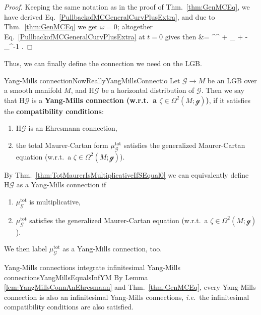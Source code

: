 \documentclass[a4paper,oneside,11pt,bibliography=totoc]{scrartcl}
\def\bas#1\eas{\begin{align*}#1\end{align*}}
\theoremstyle{plain}
\theoremstyle{remark}
\theoremstyle{definition}
\begin{document}
\begin{proof}
\leavevmode\newline
Keeping the same notation as in the proof of Thm.\ \ref{thm:GenMCEq}, we have derived Eq.\ \eqref{PullbackofMCGeneralCurvPlusExtra}, and due to Thm.\ \ref{thm:GenMCEq} we get $\omega = 0$; altogether Eq.\ \eqref{PullbackofMCGeneralCurvPlusExtra} at $t=0$ gives then
\bas
0
&=
^{\nabla^{}} \Delta\sigma
	+  \mleft[ \Delta\sigma \stackrel{\wedge}{,} \Delta\sigma \mright]_{}
	+ \zeta
	- _{\sigma^{-1}} \circ \zeta.
\eas
\end{proof}

Thus, we can finally define the connection we need on the LGB.

\begin{definitions}{Yang-Mills connection}{NowReallyYangMillsConnectio}
Let $\mathcal{G} \to M$ be an LGB over a smooth manifold $M$, and $\mathrm{H}\mathcal{G}$ be a horizontal distribution of $\mathcal{G}$. Then we say that $\mathrm{H}\mathcal{G}$ is a \textbf{Yang-Mills connection (w.r.t.\ a $\zeta \in \Omega^2(M; \mathcal{g})$)}, if it satisfies the \textbf{compatibility conditions}:
\begin{enumerate}
	\item $\mathrm{H}\mathcal{G}$ is an Ehresmann connection,
	\item the total Maurer-Cartan form $\mu_{\mathcal{G}}^{\mathrm{tot}}$ satisfies the generalized Maurer-Cartan equation (w.r.t.\ a $\zeta \in \Omega^2(M; \mathcal{g})$).
\end{enumerate}
By Thm.\ \ref{thm:TotMaurerIsMultiplicativeIfSEqual0} we can equivalently define $\mathrm{H}\mathcal{G}$ as a Yang-Mills connection if
\begin{enumerate}
	\item $\mu_{\mathcal{G}}^{\mathrm{tot}}$ is multiplicative,
	\item $\mu_{\mathcal{G}}^{\mathrm{tot}}$ satisfies the generalized Maurer-Cartan equation (w.r.t.\ a $\zeta \in \Omega^2(M; \mathcal{g})$).
\end{enumerate}

We then label $\mu_{\mathcal{G}}^{\mathrm{tot}}$ as a Yang-Mills connection, too.
\end{definitions}

\begin{remarks}{Yang-Mills connections integrate infinitesimal Yang-Mills connections}{YangMillsEqualsInfYM}
By Lemma \ref{lem:YangMillsConnAnEhresmann} and Thm.\ \ref{thm:GenMCEq}, every Yang-Mills connection is also an infinitesimal Yang-Mills connections, \textit{i.e.}\ the infinitesimal compatibility conditions are also satisfied.
\end{remarks}
\end{document}
